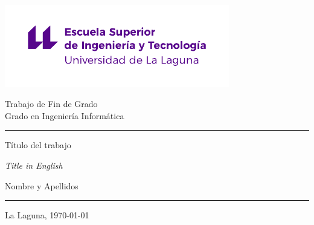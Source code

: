 \documentclass[a4paper,12pt,oneside]{scrbook}
\begin{document}
   



\pagestyle{empty}
\newcommand{\HRule}{\rule{\linewidth}{0.3mm}}
{
    \setlength{\parindent}{0mm}
    \setlength{\parskip}{0mm}
    
    \vspace*{1.20cm}
    \includegraphics[width=9.81cm]{images/logos/escuela-ingenieria-tecnologia-original}
    
    {\centering
    \fontsize{32pt}{32pt}\selectfont Trabajo de Fin de Grado\\[10pt]
    \fontsize{20pt}{20pt}\selectfont Grado en Ingeniería Informática\par}
    \HRule\vspace*{-2mm}
    \begin{flushright}
        {\fontsize{32pt}{32pt}\selectfont Título del trabajo\par
        \vspace*{3mm}
        \fontsize{18pt}{18pt}\selectfont \textit{Title in English}\par
        \vspace*{11mm}
        \fontsize{16pt}{16pt}\selectfont Nombre y Apellidos
        }\vspace*{12mm}
    \end{flushright}
    \HRule
    
    \begin{center}
        \fontsize{18pt}{18pt}\selectfont La Laguna, \today
    \end{center}
}

\frontmatter
{}
\thispagestyle{empty}
\end{document}
